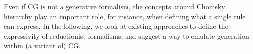 




Even if CG is not a generative formalism, the concepts around Chomsky hierarchy play an important role, for instance, when defining what a single rule can express. 
In the following, we look at existing approaches to define the expressivity of reductionist formalisms, 
and suggest a way to emulate generation within (a variant of) CG.




